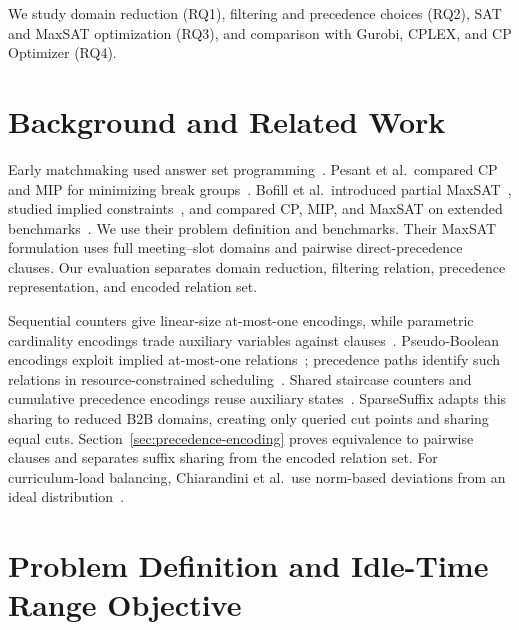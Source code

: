 \documentclass[conference,a4paper]{IEEEtran}
\newcommand{\revised}[1]{#1}
\begin{document}
\revised{We study domain reduction (RQ1), filtering and precedence choices (RQ2), SAT and MaxSAT optimization (RQ3), and comparison with Gurobi, CPLEX, and CP Optimizer (RQ4).}

\section{Background and Related Work}
\label{sec:related}

\revised{Early matchmaking used answer set programming~\cite{gebser2013}. Pesant et al.\ compared CP and MIP for minimizing break groups~\cite{pesant2015}. Bofill et al.\ introduced partial MaxSAT~\cite{bofill2015}, studied implied constraints~\cite{bofill2019,bofill2022impact}, and compared CP, MIP, and MaxSAT on extended benchmarks~\cite{bofill2022}. We use their problem definition and benchmarks. Their MaxSAT formulation uses full meeting--slot domains and pairwise direct-precedence clauses. Our evaluation separates domain reduction, filtering relation, precedence representation, and encoded relation set.}

\revised{Sequential counters give linear-size at-most-one encodings, while parametric cardinality encodings trade auxiliary variables against clauses~\cite{sinz2005,abio2013}. Pseudo-Boolean encodings exploit implied at-most-one relations~\cite{bofill2022pbamo}; precedence paths identify such relations in resource-constrained scheduling~\cite{bofill2020}. Shared staircase counters and cumulative precedence encodings reuse auxiliary states~\cite{truong2025,vankieu2025compact}. SparseSuffix adapts this sharing to reduced B2B domains, creating only queried cut points and sharing equal cuts. Section~\ref{sec:precedence-encoding} proves equivalence to pairwise clauses and separates suffix sharing from the encoded relation set.} \revised{For curriculum-load balancing, Chiarandini et al.\ use norm-based deviations from an ideal distribution~\cite{chiarandini2012}.}

\section{Problem Definition and Idle-Time Range Objective}
\label{sec:problem}
\end{document}
